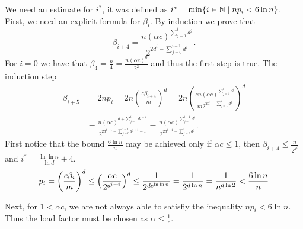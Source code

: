 We need an estimate for $i^*$, it was defined as $i^* = \displaystyle\min \{i \in \mathbb{N} \mid np_i < 6 \ln n\}$. First, we need an explicit formula for $\beta_i$. By induction we prove that $$\beta_{i + 4} = \frac{n \left(\alpha c\right) ^ {\sum_{j = 1}^{i}d ^ j}}{2 ^ {2 d ^ i - \sum_{j = 0}^{i - 1}{d ^ j}}} \textit{.}$$
For $i = 0$ we have that $\beta_4 = \frac{n}{4} = \frac{n\left(\alpha c\right) ^ 0}{2 ^ {2}}$ and thus the first step is true. The induction step
\[
\begin{split}
\beta_{i + 5} 
	& = 2np_i = 2n \left(\frac{c\beta_{i + 4}}{m}\right) ^ d = 2n \left(\frac{cn\left(\alpha c\right) ^ {\sum_{j = 1}^{i}d ^ j}}{m 2 ^ {2 d ^ i - \sum_{j = 1}^{i}d^j}}\right) ^ d \\
	& = \frac{n\left(\alpha c\right) ^ {d + \sum_{j = 1}^{i} d ^ {j + 1}}}{2 ^ {2d ^ {i + 1} - \sum_{j = 0}^{i  -1} d ^ {j + 1} - 1}} = \frac{n \left(\alpha c\right) ^ {\sum_{j = 1}^{i + 1} d ^ j}}{2 ^ {2d ^ {i + 1} - \sum_{j = 0}^{i} d ^ j}} \textit{.}
\end{split}
\]
First notice that the bound $\frac{6 \ln n}{n}$ may be achieved only if $\alpha c \leq 1$, then $\beta_{i + 4} \leq \frac{n}{2 ^ {d ^ i}}$ and $i^* = \frac{\ln \ln n}{\ln d} + 4$.
\[
p_i = \left(\frac{c\beta_i}{m}\right) ^ d \leq \left(\frac{\alpha c}{2 ^ {d ^ {i - 4}}}\right) ^ d \leq \frac{1}{2 ^ {de^{\ln \ln n}}} = \frac{1}{2 ^ {d \ln n}} = \frac{1}{n ^ {d \ln 2}} < \frac{6 \ln n}{n}\\
\]

Next, for $1 < \alpha c$, we are not always able to satisfiy the inequality $np_i < 6 \ln n$. Thus the load factor must be chosen as $\alpha \leq \frac{1}{c}$.
